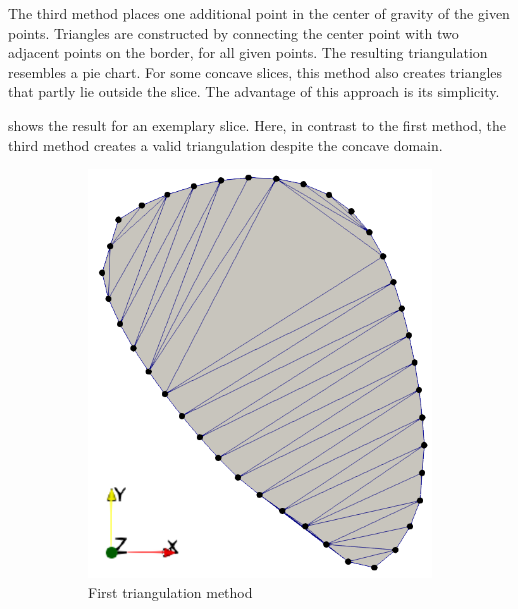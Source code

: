 The third method places one additional point in the center of gravity of the given points. Triangles are constructed by connecting the center point with two adjacent points on the border, for all given points. The resulting triangulation resembles a pie chart. For some concave slices, this method also creates triangles that partly lie outside the slice. The advantage of this approach is its simplicity.

 shows the result for an exemplary slice. Here, in contrast to the first method, the third method creates a valid triangulation despite the concave domain.

\begin{figure}%
  \centering%
  \begin{subfigure}[t]{0.31\textwidth}%
    \centering%
    \includegraphics[width=\textwidth]{images/fiber_creation/triangulation_0.png}%
    \caption{First triangulation method}%
    \label{fig:triangulation_0}%
  \end{subfigure}
  \quad
  \begin{subfigure}[t]{0.31\textwidth}%
    \centering%

\end{subfigure}
\end{figure}
